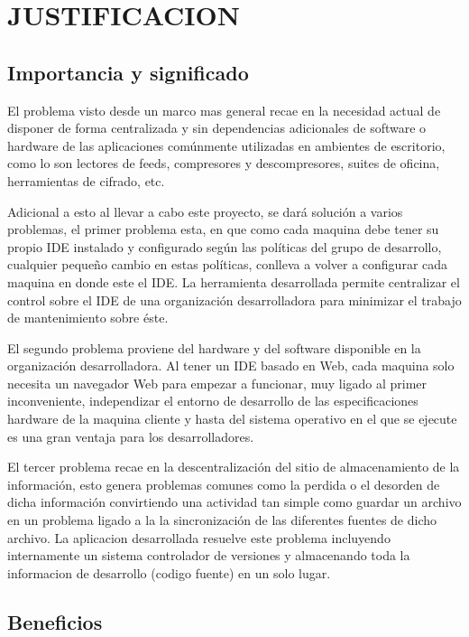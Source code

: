 \section{JUSTIFICACION}


\subsection{Importancia y significado}

El problema visto desde un marco mas general recae en la necesidad actual de disponer de forma centralizada y sin dependencias adicionales de software o hardware de las aplicaciones comúnmente utilizadas en ambientes de escritorio, como lo son lectores de feeds, compresores y descompresores, suites de oficina, herramientas de cifrado, etc.

Adicional a esto al llevar a cabo este proyecto, se dará solución a varios problemas, el primer problema esta, en que como cada maquina debe tener su propio IDE instalado y configurado según las políticas del grupo de desarrollo, cualquier pequeño cambio en estas políticas, conlleva a volver a configurar cada maquina en donde este el IDE. La herramienta desarrollada permite centralizar el control sobre el IDE de una organización desarrolladora para minimizar el trabajo de mantenimiento sobre éste.

El segundo problema proviene del hardware y del software disponible en la organización desarrolladora. Al tener un IDE basado en Web, cada maquina solo necesita un navegador Web para empezar a funcionar, muy ligado al primer inconveniente, independizar el entorno de desarrollo de las especificaciones hardware de la maquina cliente y hasta del sistema operativo en el que se ejecute es una gran ventaja para los desarrolladores.

El tercer problema recae en la descentralización del sitio de almacenamiento de la información, esto genera problemas comunes como la perdida o el desorden de dicha información convirtiendo una actividad tan simple como guardar un archivo en un problema ligado a la la sincronización de las diferentes fuentes de dicho archivo. La aplicacion desarrollada resuelve este problema incluyendo internamente un sistema controlador de versiones y almacenando toda la informacion de desarrollo (codigo fuente) en un solo lugar.


\subsection{Beneficios}

